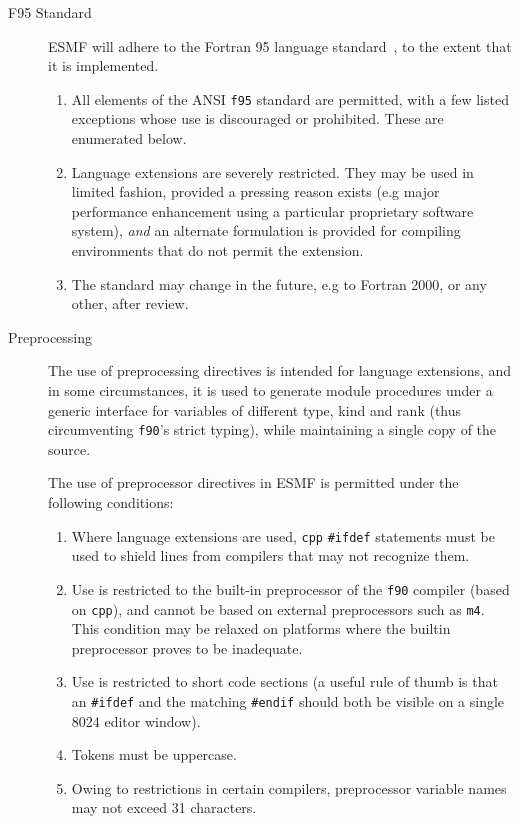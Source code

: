 \begin{description}

\item[F95 Standard] ESMF will adhere to the Fortran 95 language
  standard~\cite{ref:f95}, to the extent that it is implemented.

\begin{enumerate}
\item All elements of the ANSI \texttt{f95} standard are permitted,
  with a few listed exceptions whose use is discouraged or prohibited.
  These are enumerated below.
\item Language extensions are severely restricted. They may be used in
  limited fashion, provided a pressing reason exists (e.g major
  performance enhancement using a particular proprietary software
  system), \emph{and} an alternate formulation is provided for compiling
  environments that do not permit the extension.
\item The standard may change in the future, e.g to Fortran 2000, or
  any other, after review.
\end{enumerate}
  
\item[Preprocessing] The use of preprocessing directives is intended
  for language extensions, and in some circumstances, it is used to
  generate module procedures under a generic interface for variables
  of different type, kind and rank (thus circumventing \texttt{f90}'s
  strict typing), while maintaining a single copy of the source.

The use of preprocessor directives in ESMF is permitted under the
following conditions:

\begin{enumerate}
\item Where language extensions are used, \texttt{cpp}
  \texttt{\#ifdef} statements must be used to shield lines from
  compilers that may not recognize them.
\item Use is restricted to the built-in preprocessor of the
  \texttt{f90} compiler (based on \texttt{cpp}), and cannot be based
  on external preprocessors such as \texttt{m4}. This condition may be
  relaxed on platforms where the builtin preprocessor proves to be
  inadequate.
\item Use is restricted to short code sections (a useful rule of thumb
  is that an \texttt{\#ifdef} and the matching \texttt{\#endif} should
  both be visible on a single 8024 editor
  window).
\item Tokens must be uppercase.
\item Owing to restrictions in certain compilers, preprocessor
  variable names may not exceed 31 characters.
\end{enumerate}


\end{description}
